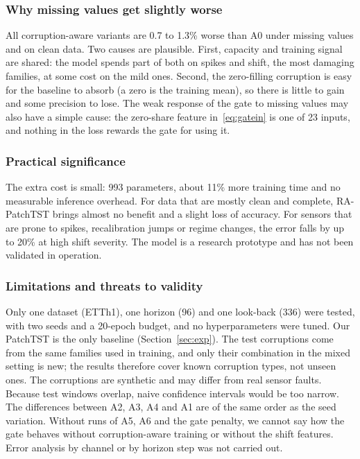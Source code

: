 \subsubsection{Why missing values get slightly worse}
All corruption-aware variants are 0.7 to 1.3\% worse than A0 under missing values and on clean data. Two causes are plausible. First, capacity and training signal are shared: the model spends part of both on spikes and shift, the most damaging families, at some cost on the mild ones. Second, the zero-filling corruption is easy for the baseline to absorb (a zero is the training mean), so there is little to gain and some precision to lose. The weak response of the gate to missing values may also have a simple cause: the zero-share feature in~\eqref{eq:gatein} is one of 23 inputs, and nothing in the loss rewards the gate for using it.

\subsubsection{Practical significance}
The extra cost is small: 993 parameters, about 11\% more training time and no measurable inference overhead. For data that are mostly clean and complete, RA-PatchTST brings almost no benefit and a slight loss of accuracy. For sensors that are prone to spikes, recalibration jumps or regime changes, the error falls by up to 20\% at high shift severity. The model is a research prototype and has not been validated in operation.

\subsubsection{Limitations and threats to validity}
\label{sec:limitations}
Only one dataset (ETTh1), one horizon (96) and one look-back (336) were tested, with two seeds and a 20-epoch budget, and no hyperparameters were tuned. Our PatchTST is the only baseline (Section~\ref{sec:exp}). The test corruptions come from the same families used in training, and only their combination in the mixed setting is new; the results therefore cover known corruption types, not unseen ones. The corruptions are synthetic and may differ from real sensor faults. Because test windows overlap, naive confidence intervals would be too narrow. The differences between A2, A3, A4 and A1 are of the same order as the seed variation. Without runs of A5, A6 and the gate penalty, we cannot say how the gate behaves without corruption-aware training or without the shift features. Error analysis by channel or by horizon step was not carried out.
